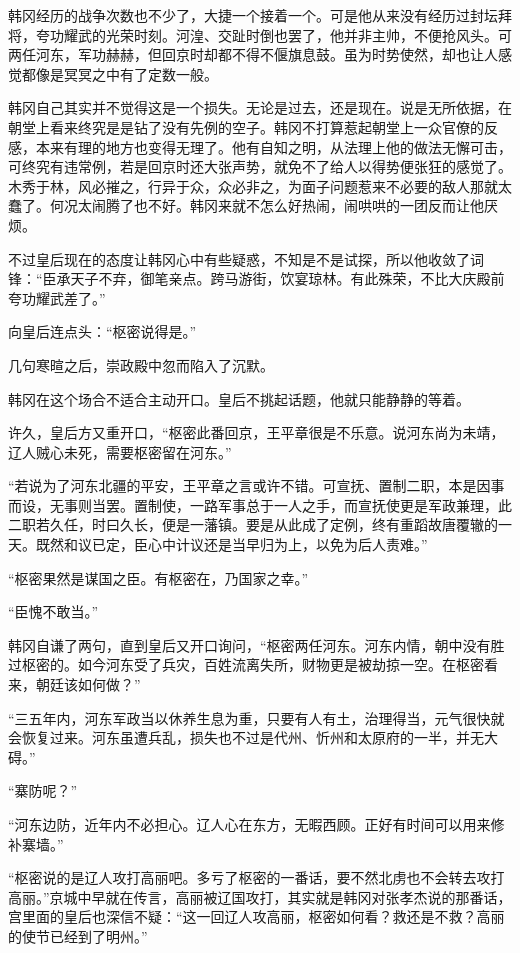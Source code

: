 韩冈经历的战争次数也不少了，大捷一个接着一个。可是他从来没有经历过封坛拜将，夸功耀武的光荣时刻。河湟、交趾时倒也罢了，他并非主帅，不便抢风头。可两任河东，军功赫赫，但回京时却都不得不偃旗息鼓。虽为时势使然，却也让人感觉都像是冥冥之中有了定数一般。

韩冈自己其实并不觉得这是一个损失。无论是过去，还是现在。说是无所依据，在朝堂上看来终究是是钻了没有先例的空子。韩冈不打算惹起朝堂上一众官僚的反感，本来有理的地方也变得无理了。他有自知之明，从法理上他的做法无懈可击，可终究有违常例，若是回京时还大张声势，就免不了给人以得势便张狂的感觉了。木秀于林，风必摧之，行异于众，众必非之，为面子问题惹来不必要的敌人那就太蠢了。何况太闹腾了也不好。韩冈来就不怎么好热闹，闹哄哄的一团反而让他厌烦。

不过皇后现在的态度让韩冈心中有些疑惑，不知是不是试探，所以他收敛了词锋：“臣承天子不弃，御笔亲点。跨马游街，饮宴琼林。有此殊荣，不比大庆殿前夸功耀武差了。”

向皇后连点头：“枢密说得是。”

几句寒暄之后，崇政殿中忽而陷入了沉默。

韩冈在这个场合不适合主动开口。皇后不挑起话题，他就只能静静的等着。

许久，皇后方又重开口，“枢密此番回京，王平章很是不乐意。说河东尚为未靖，辽人贼心未死，需要枢密留在河东。”

“若说为了河东北疆的平安，王平章之言或许不错。可宣抚、置制二职，本是因事而设，无事则当罢。置制使，一路军事总于一人之手，而宣抚使更是军政兼理，此二职若久任，时曰久长，便是一藩镇。要是从此成了定例，终有重蹈故唐覆辙的一天。既然和议已定，臣心中计议还是当早归为上，以免为后人责难。”

“枢密果然是谋国之臣。有枢密在，乃国家之幸。”

“臣愧不敢当。”

韩冈自谦了两句，直到皇后又开口询问，“枢密两任河东。河东内情，朝中没有胜过枢密的。如今河东受了兵灾，百姓流离失所，财物更是被劫掠一空。在枢密看来，朝廷该如何做？”

“三五年内，河东军政当以休养生息为重，只要有人有土，治理得当，元气很快就会恢复过来。河东虽遭兵乱，损失也不过是代州、忻州和太原府的一半，并无大碍。”

“寨防呢？”

“河东边防，近年内不必担心。辽人心在东方，无暇西顾。正好有时间可以用来修补寨墙。”

“枢密说的是辽人攻打高丽吧。多亏了枢密的一番话，要不然北虏也不会转去攻打高丽。”京城中早就在传言，高丽被辽国攻打，其实就是韩冈对张孝杰说的那番话，宫里面的皇后也深信不疑：“这一回辽人攻高丽，枢密如何看？救还是不救？高丽的使节已经到了明州。”

